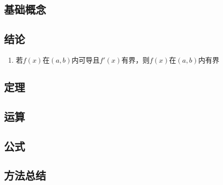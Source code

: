 \documentclass[a4paper,12pt]{article}
\begin{document}
    \subsection{基础概念}

    \begin{enumerate}
    \end{enumerate}

    \subsection{结论}

    \begin{enumerate}
        \item 若$f(x)$在$(a, b)$内可导且$f'(x)$有界，则$f(x)$在$(a, b)$内有界
    \end{enumerate}

    \subsection{定理}

    \begin{enumerate}
    \end{enumerate}

    \subsection{运算}

    \begin{enumerate}

    \end{enumerate}

    \subsection{公式}

    \begin{enumerate}

    \end{enumerate}

    \subsection{方法总结}
\end{document}
